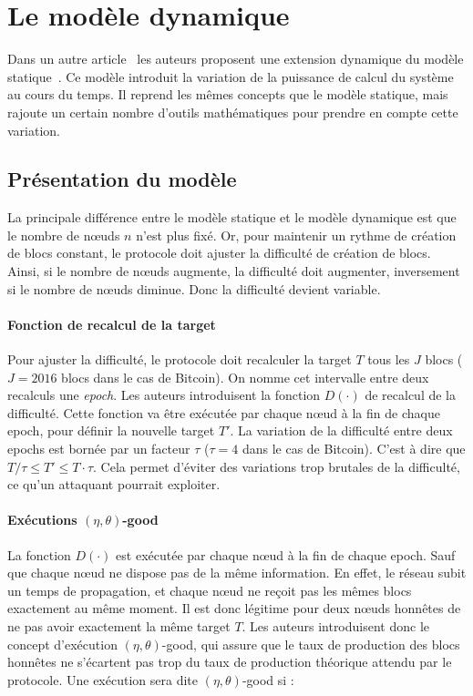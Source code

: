     
\section{Le modèle dynamique}\label{sec:dynamic}

    Dans un autre article~\cite{dynamic_backbone} les auteurs proposent une
    extension dynamique du modèle statique~\cite{static_backbone}. Ce modèle
    introduit la variation de la puissance de calcul du système au cours du
    temps. Il reprend les mêmes concepts que le modèle statique, mais rajoute un
    certain nombre d'outils mathématiques pour prendre en compte cette
    variation.


    \subsection{Présentation du modèle}\label{subsec:dynamic-presentation}

    La principale différence entre le modèle statique et le modèle dynamique est
    que le nombre de nœuds $n$ n'est plus fixé. Or, pour maintenir un rythme
    de création de blocs constant, le protocole doit ajuster la difficulté de
    création de blocs. Ainsi, si le nombre de nœuds augmente, la difficulté
    doit augmenter, inversement si le nombre de nœuds diminue. Donc la
    difficulté devient variable.

    \paragraph{Fonction de recalcul de la target} Pour ajuster la difficulté, le
    protocole doit recalculer la target $T$ tous les $J$ blocs ($J = 2016$ blocs
    dans le cas de Bitcoin). On nomme cet intervalle entre deux recalculs une
    \textit{epoch}. Les auteurs introduisent la fonction $D(\cdot)$ de recalcul
    de la difficulté. Cette fonction va être exécutée par chaque nœud à la fin
    de chaque epoch, pour définir la nouvelle target $T'$. La variation de la
    difficulté entre deux epochs est bornée par un facteur $\tau$ ($\tau = 4$
    dans le cas de Bitcoin). C'est à dire que $T/\tau \leq T' \leq T\cdot\tau$.
    Cela permet d'éviter des variations trop brutales de la difficulté, ce qu'un
    attaquant pourrait exploiter.

    \paragraph{Exécutions $(\eta, \theta)$-good} La fonction $D(\cdot)$ est
    exécutée par chaque nœud à la fin de chaque epoch. Sauf que chaque nœud ne
    dispose pas de la même information. En effet, le réseau subit un temps de
    propagation, et chaque nœud ne reçoit pas les mêmes blocs exactement au même
    moment. Il est donc légitime pour deux nœuds honnêtes de ne pas avoir
    exactement la même target $T$. Les auteurs introduisent donc le concept
    d'exécution $(\eta, \theta)$-good, qui assure que le taux de production des
    blocs honnêtes ne s'écartent pas trop du taux de production théorique
    attendu par le protocole. Une exécution sera dite $(\eta, \theta)$-good si :

